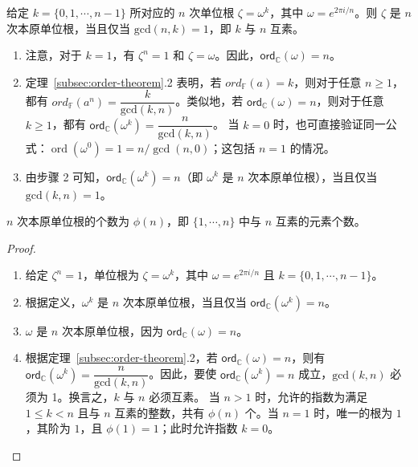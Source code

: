 \begin{tcolorbox}[title={\textbf{\tboxtheorem{\ref*{subsec:roots-theorem}.4} $\bm{n}$ 次本原单位根的判定条件}}]
给定 $k = \{0, 1, \cdots, n-1\}$ 所对应的 $n$ 次单位根 $\zeta = \omega^k$，其中 $\omega = e^{2\pi i/n}$。则 $\zeta$ 是 $n$ 次本原单位根，当且仅当 $\text{gcd}(n, k) = 1$，即 $k$ 与 $n$ 互素。
\end{tcolorbox}
\begin{myproof}
    \begin{enumerate}
    \item 注意，对于 $k = 1$，有 $\zeta^n = 1$ 和 $\zeta = \omega$。因此，$\textsf{ord}_{\mathbb{C}}(\omega) = n$。
    \item 定理~\ref*{subsec:order-theorem}.2 表明，若 $ord_{\mathbb{F}}(a) = k$，则对于任意 $n \geq 1$，都有 $ord_{\mathbb{F}}(a^n) = \dfrac{k}{\text{gcd}(k,n)}$。类似地，若 $\textsf{ord}_{\mathbb{C}}(\omega) = n$，则对于任意 $k \geq 1$，都有 $\textsf{ord}_{\mathbb{C}}(\omega^k) = \dfrac{n}{\text{gcd}(k, n)}$。 当 $k=0$ 时，也可直接验证同一公式：$\operatorname{ord}(\omega^0)=1=n/\gcd(n,0)$；这包括 $n=1$ 的情况。
    \item 由步骤 2 可知，$\textsf{ord}_{\mathbb{C}}(\omega^k) = n$（即 $\omega^k$ 是 $n$ 次本原单位根），当且仅当 $\text{gcd}(k, n) = 1$。
    \end{enumerate}
\end{myproof}

\begin{tcolorbox}[title={\textbf{\tboxtheorem{\ref*{subsec:roots-theorem}.5} $\bm{n}$ 次本原单位根的个数}}]
$n$ 次本原单位根的个数为 $\phi(n)$，即 $\{1, \cdots, n \}$ 中与 $n$ 互素的元素个数。
\end{tcolorbox}

\begin{proof}
$ $
\begin{enumerate}
\item 给定 $\zeta^n = 1$，单位根为 $\zeta = \omega^k$，其中 $\omega = e^{2\pi i/n}$ 且 $k = \{0, 1, \cdots, n-1\}$。
\item 根据定义，$\omega^k$ 是 $n$ 次本原单位根，当且仅当 $\textsf{ord}_{\mathbb{C}}(\omega^k) = n$。
\item $\omega$ 是 $n$ 次本原单位根，因为 $\textsf{ord}_{\mathbb{C}}(\omega) = n$。
\item 根据定理~\ref*{subsec:order-theorem}.2，若 $\textsf{ord}_{\mathbb{C}}(\omega) = n$，则有 $\textsf{ord}_{\mathbb{C}}(\omega^k) = \dfrac{n}{\text{gcd}(k,n)}$。因此，要使 $\textsf{ord}_{\mathbb{C}}(\omega^k) = n$ 成立，$\text{gcd}(k,n)$ 必须为 1。换言之，$k$ 与 $n$ 必须互素。
当 $n>1$ 时，允许的指数为满足 $1\le k<n$ 且与 $n$ 互素的整数，共有 $\phi(n)$ 个。当 $n=1$ 时，唯一的根为 $1$，其阶为 $1$，且 $\phi(1)=1$；此时允许指数 $k=0$。
\end{enumerate}
\end{proof}
